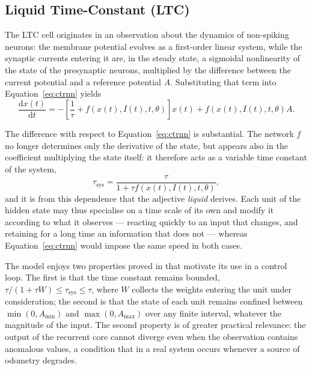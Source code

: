 \subsection{Liquid Time-Constant (LTC)}
\label{sec:cell-ltc}

The LTC cell \cite{hasani2021ltc} originates in an observation about the
dynamics of non-spiking neurons: the membrane potential evolves as a first-order
linear system, while the synaptic currents entering it are, in the steady state,
a sigmoidal nonlinearity of the state of the presynaptic neurons, multiplied by
the difference between the current potential and a reference potential $A$.
Substituting that term into Equation~\eqref{eq:ctrnn} yields
\begin{equation}
  \frac{\mathrm{d}x(t)}{\mathrm{d}t}
    = -\left[\frac{1}{\tau} + f\!\left(x(t), I(t), t, \theta\right)\right] x(t)
      + f\!\left(x(t), I(t), t, \theta\right) A .
  \label{eq:ltc}
\end{equation}

The difference with respect to Equation~\eqref{eq:ctrnn} is substantial. The
network $f$ no longer determines only the derivative of the state, but appears
also in the coefficient multiplying the state itself: it therefore acts as a
variable time constant of the system,
\begin{equation}
  \tau_{\text{sys}}
    = \frac{\tau}{1 + \tau f\!\left(x(t), I(t), t, \theta\right)} ,
  \label{eq:tausys}
\end{equation}
and it is from this dependence that the adjective \emph{liquid} derives. Each
unit of the hidden state may thus specialise on a time scale of its own and
modify it according to what it observes --- reacting quickly to an input that
changes, and retaining for a long time an information that does not --- whereas
Equation~\eqref{eq:ctrnn} would impose the same speed in both cases.

The model enjoys two properties proved in \cite{hasani2021ltc} that motivate its
use in a control loop. The first is that the time constant remains bounded,
$\tau/(1 + \tau W) \le \tau_{\text{sys}} \le \tau$, where $W$ collects the
weights entering the unit under consideration; the second is that the state of
each unit remains confined between $\min(0, A_{\min})$ and $\max(0, A_{\max})$
over any finite interval, whatever the magnitude of the input. The second
property is of greater practical relevance: the output of the recurrent core
cannot diverge even when the observation contains anomalous values, a condition
that in a real system occurs whenever a source of odometry degrades.

